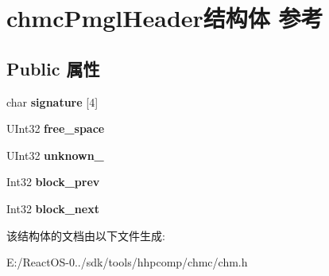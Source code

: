 \hypertarget{structchmc_pmgl_header}{}\section{chmc\+Pmgl\+Header结构体 参考}
\label{structchmc_pmgl_header}
\subsection*{Public 属性}
\begin{DoxyCompactItemize}
\item 
\mbox{\label{structchmc_pmgl_header_a46b36d0f86c441ca20fa4a8c8407bf68}} 
char {\bfseries signature} \mbox{[}4\mbox{]}
\item 
\mbox{\label{structchmc_pmgl_header_abe157217712fbcccfd4f886fa3334a9e}} 
U\+Int32 {\bfseries free\+\_\+space}
\item 
\mbox{\label{structchmc_pmgl_header_ab1534062db906a327429d6e22a80de06}} 
U\+Int32 {\bfseries unknown\+\_}
\item 
\mbox{\label{structchmc_pmgl_header_a6ff559361c2c1eaadd379f1f21cd6b10}} 
Int32 {\bfseries block\+\_\+prev}
\item 
\mbox{\label{structchmc_pmgl_header_a9e6f42819dd808f97f63c1d22031caa0}} 
Int32 {\bfseries block\+\_\+next}
\end{DoxyCompactItemize}


该结构体的文档由以下文件生成\+:\begin{DoxyCompactItemize}
\item 
E\+:/\+React\+O\+S-\/0../sdk/tools/hhpcomp/chmc/chm.\+h\end{DoxyCompactItemize}
